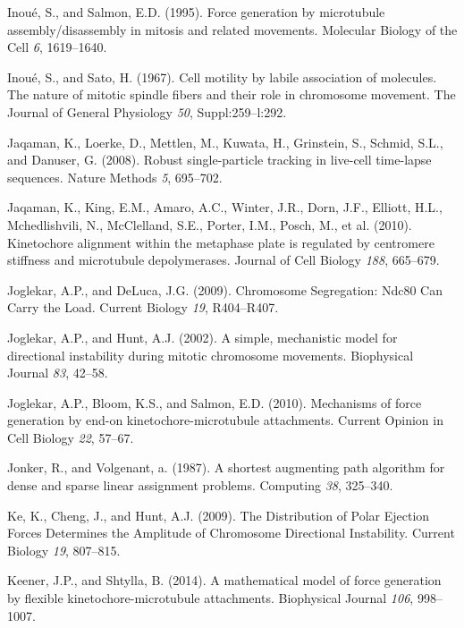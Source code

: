 \documentclass[12pt,a4paper,twoside,openright]{book}
\begin{document}
Inoué, S., and Salmon, E.D. (1995). Force generation by microtubule
assembly/disassembly in mitosis and related movements. Molecular Biology
of the Cell \emph{6}, 1619--1640.

Inoué, S., and Sato, H. (1967). Cell motility by labile association of
molecules. The nature of mitotic spindle fibers and their role in
chromosome movement. The Journal of General Physiology \emph{50},
Suppl:259--l:292.

Jaqaman, K., Loerke, D., Mettlen, M., Kuwata, H., Grinstein, S., Schmid,
S.L., and Danuser, G. (2008). Robust single-particle tracking in
live-cell time-lapse sequences. Nature Methods \emph{5}, 695--702.

Jaqaman, K., King, E.M., Amaro, A.C., Winter, J.R., Dorn, J.F., Elliott,
H.L., Mchedlishvili, N., McClelland, S.E., Porter, I.M., Posch, M., et
al. (2010). Kinetochore alignment within the metaphase plate is
regulated by centromere stiffness and microtubule depolymerases. Journal
of Cell Biology \emph{188}, 665--679.

Joglekar, A.P., and DeLuca, J.G. (2009). Chromosome Segregation: Ndc80
Can Carry the Load. Current Biology \emph{19}, R404--R407.

Joglekar, A.P., and Hunt, A.J. (2002). A simple, mechanistic model for
directional instability during mitotic chromosome movements. Biophysical
Journal \emph{83}, 42--58.

Joglekar, A.P., Bloom, K.S., and Salmon, E.D. (2010). Mechanisms of
force generation by end-on kinetochore-microtubule attachments. Current
Opinion in Cell Biology \emph{22}, 57--67.

Jonker, R., and Volgenant, a. (1987). A shortest augmenting path
algorithm for dense and sparse linear assignment problems. Computing
\emph{38}, 325--340.

Ke, K., Cheng, J., and Hunt, A.J. (2009). The Distribution of Polar
Ejection Forces Determines the Amplitude of Chromosome Directional
Instability. Current Biology \emph{19}, 807--815.

Keener, J.P., and Shtylla, B. (2014). A mathematical model of force
generation by flexible kinetochore-microtubule attachments. Biophysical
Journal \emph{106}, 998--1007.
\end{document}
